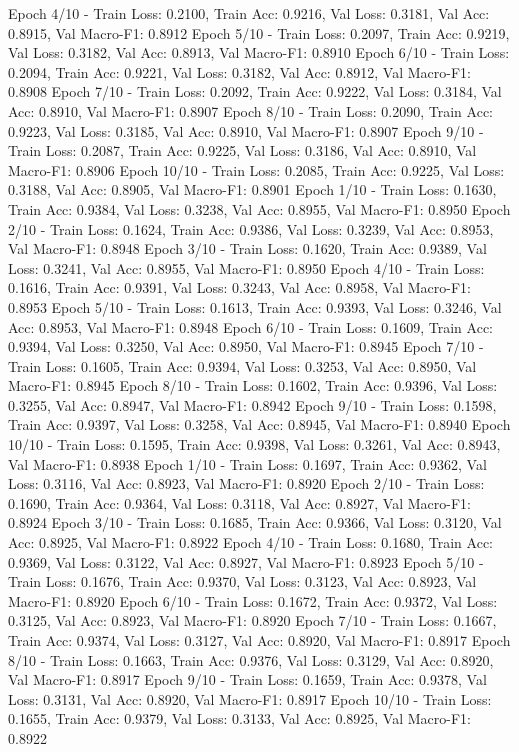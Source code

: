 \documentclass{article}
\begin{document}
Epoch 4/10 - Train Loss: 0.2100, Train Acc: 0.9216, Val Loss: 0.3181, Val Acc: 0.8915, Val Macro-F1: 0.8912
Epoch 5/10 - Train Loss: 0.2097, Train Acc: 0.9219, Val Loss: 0.3182, Val Acc: 0.8913, Val Macro-F1: 0.8910
Epoch 6/10 - Train Loss: 0.2094, Train Acc: 0.9221, Val Loss: 0.3182, Val Acc: 0.8912, Val Macro-F1: 0.8908
Epoch 7/10 - Train Loss: 0.2092, Train Acc: 0.9222, Val Loss: 0.3184, Val Acc: 0.8910, Val Macro-F1: 0.8907
Epoch 8/10 - Train Loss: 0.2090, Train Acc: 0.9223, Val Loss: 0.3185, Val Acc: 0.8910, Val Macro-F1: 0.8907
Epoch 9/10 - Train Loss: 0.2087, Train Acc: 0.9225, Val Loss: 0.3186, Val Acc: 0.8910, Val Macro-F1: 0.8906
Epoch 10/10 - Train Loss: 0.2085, Train Acc: 0.9225, Val Loss: 0.3188, Val Acc: 0.8905, Val Macro-F1: 0.8901
Epoch 1/10 - Train Loss: 0.1630, Train Acc: 0.9384, Val Loss: 0.3238, Val Acc: 0.8955, Val Macro-F1: 0.8950
Epoch 2/10 - Train Loss: 0.1624, Train Acc: 0.9386, Val Loss: 0.3239, Val Acc: 0.8953, Val Macro-F1: 0.8948
Epoch 3/10 - Train Loss: 0.1620, Train Acc: 0.9389, Val Loss: 0.3241, Val Acc: 0.8955, Val Macro-F1: 0.8950
Epoch 4/10 - Train Loss: 0.1616, Train Acc: 0.9391, Val Loss: 0.3243, Val Acc: 0.8958, Val Macro-F1: 0.8953
Epoch 5/10 - Train Loss: 0.1613, Train Acc: 0.9393, Val Loss: 0.3246, Val Acc: 0.8953, Val Macro-F1: 0.8948
Epoch 6/10 - Train Loss: 0.1609, Train Acc: 0.9394, Val Loss: 0.3250, Val Acc: 0.8950, Val Macro-F1: 0.8945
Epoch 7/10 - Train Loss: 0.1605, Train Acc: 0.9394, Val Loss: 0.3253, Val Acc: 0.8950, Val Macro-F1: 0.8945
Epoch 8/10 - Train Loss: 0.1602, Train Acc: 0.9396, Val Loss: 0.3255, Val Acc: 0.8947, Val Macro-F1: 0.8942
Epoch 9/10 - Train Loss: 0.1598, Train Acc: 0.9397, Val Loss: 0.3258, Val Acc: 0.8945, Val Macro-F1: 0.8940
Epoch 10/10 - Train Loss: 0.1595, Train Acc: 0.9398, Val Loss: 0.3261, Val Acc: 0.8943, Val Macro-F1: 0.8938
Epoch 1/10 - Train Loss: 0.1697, Train Acc: 0.9362, Val Loss: 0.3116, Val Acc: 0.8923, Val Macro-F1: 0.8920
Epoch 2/10 - Train Loss: 0.1690, Train Acc: 0.9364, Val Loss: 0.3118, Val Acc: 0.8927, Val Macro-F1: 0.8924
Epoch 3/10 - Train Loss: 0.1685, Train Acc: 0.9366, Val Loss: 0.3120, Val Acc: 0.8925, Val Macro-F1: 0.8922
Epoch 4/10 - Train Loss: 0.1680, Train Acc: 0.9369, Val Loss: 0.3122, Val Acc: 0.8927, Val Macro-F1: 0.8923
Epoch 5/10 - Train Loss: 0.1676, Train Acc: 0.9370, Val Loss: 0.3123, Val Acc: 0.8923, Val Macro-F1: 0.8920
Epoch 6/10 - Train Loss: 0.1672, Train Acc: 0.9372, Val Loss: 0.3125, Val Acc: 0.8923, Val Macro-F1: 0.8920
Epoch 7/10 - Train Loss: 0.1667, Train Acc: 0.9374, Val Loss: 0.3127, Val Acc: 0.8920, Val Macro-F1: 0.8917
Epoch 8/10 - Train Loss: 0.1663, Train Acc: 0.9376, Val Loss: 0.3129, Val Acc: 0.8920, Val Macro-F1: 0.8917
Epoch 9/10 - Train Loss: 0.1659, Train Acc: 0.9378, Val Loss: 0.3131, Val Acc: 0.8920, Val Macro-F1: 0.8917
Epoch 10/10 - Train Loss: 0.1655, Train Acc: 0.9379, Val Loss: 0.3133, Val Acc: 0.8925, Val Macro-F1: 0.8922
\end{document}
